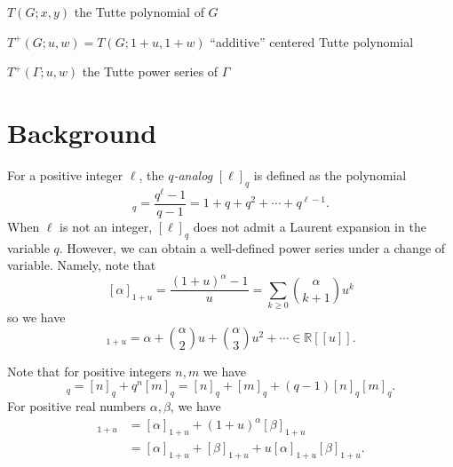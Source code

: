 \documentclass{amsart}
\theoremstyle{definition}
\newcommand{\RR}{\mathbb{R}}
\begin{document}
$T(G; x,y)$ the Tutte polynomial of $G$

$T^+(G; u,w) = T(G; 1+u,1+w)$ ``additive'' centered Tutte polynomial

$T^+(\Gamma; u,w)$ the Tutte power series of $\Gamma$




\section{Background}
For a positive integer $\ell$,
the {\em $q$-analog}
$[\ell]_q$ is defined as
the polynomial
\begin{equation*}
[\ell]_q = \frac{q^\ell - 1}{q - 1}
= 1 + q + q^2 + \cdots + q^{\ell -1} .
\end{equation*}
When $\ell$ is not an integer, 
$[\ell]_q$ does not admit a Laurent expansion in the variable $q$.
However, we can obtain a well-defined power series under a change of variable.
Namely, note that
\[ [\alpha]_{1+u} = \frac{(1+u)^\alpha - 1}{u}
= \sum_{k \geq 0} \binom{\alpha}{k+1}u^{k} 
\]
so we have 
\begin{equation}
[\alpha]_{1+u} = \alpha + \binom{\alpha}{2} u + \binom{\alpha}{3} u^2 + \cdots
\in \RR[[u]] .
\end{equation}

Note that for positive integers $n,m$ we have
\begin{equation*}
[n + m]_q =  [n ]_q + q^{n} [m]_q
 = [n]_q + [m]_q + (q-1) [n]_q [m]_q .
\end{equation*}
For positive real numbers $\alpha,\beta$, we have
\begin{align*}
[\alpha + \beta]_{1+u} &=  [\alpha]_{1+u} + (1+u)^{\alpha} [\beta]_{1+u} \\
 &= [\alpha]_{1+u} + [\beta]_{1+u} + u [\alpha]_{1+u} [\beta]_{1+u}.
\end{align*}
\end{document}
